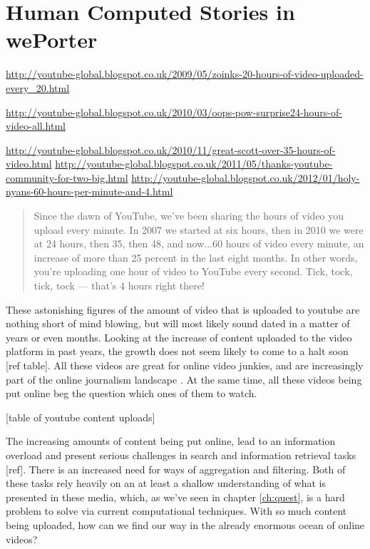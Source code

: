 \chapter{Human Computed Stories in wePorter}
\label{chap:weporter}

\url{http://youtube-global.blogspot.co.uk/2009/05/zoinks-20-hours-of-video-uploaded-every_20.html}

\url{http://youtube-global.blogspot.co.uk/2010/03/oops-pow-surprise24-hours-of-video-all.html}

\url{http://youtube-global.blogspot.co.uk/2010/11/great-scott-over-35-hours-of-video.html}
\url{http://youtube-global.blogspot.co.uk/2011/05/thanks-youtube-community-for-two-big.html}
\url{http://youtube-global.blogspot.co.uk/2012/01/holy-nyans-60-hours-per-minute-and-4.html}

\begin{quote}
  Since the dawn of YouTube, we’ve been sharing the hours of video you upload every minute. In 2007 we started at six hours, then in 2010 we were at 24 hours, then 35, then 48, and now...60 hours of video every minute, an increase of more than 25 percent in the last eight months. In other words, you’re uploading one hour of video to YouTube every second. Tick, tock, tick, tock — that’s 4 hours right there!
\end{quote}

These astonishing figures of the amount of video that is uploaded to youtube are nothing short of mind blowing, but will most likely sound dated in a matter of years or even months. Looking at the increase of content uploaded to the video platform in past years, the growth does not seem likely to come to a halt soon [ref table]. All these videos are great for online video junkies, and are increasingly part of the online journalism landscape \cite{Rosenstiel:2012vb}. At the same time, all these videos being put online beg the question which ones of them to watch.

[table of youtube content uploads]

The increasing amounts of content being put online, lead to an information overload and present serious challenges in search and information retrieval tasks [ref]. There is an increased need for ways of aggregation and filtering. Both of these tasks rely heavily on an at least a shallow understanding of what is presented in these media, which, as we've seen in chapter \ref{ch:quest}, is a hard problem to solve via current computational techniques. With so much content being uploaded, how can we find our way in the already enormous ocean of online videos?

